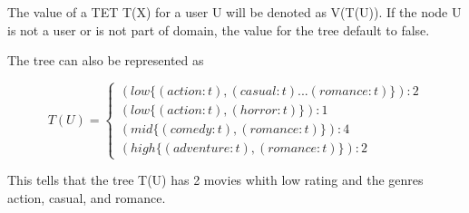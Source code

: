 
The value of a TET T(X) for a user U will be denoted as V(T(U)). If the node U is not a user or is not part of domain, the value for the tree default to false.

The tree can also be represented as 

\begin{equation}
    T(U)=
    \begin{cases}
      (low \{(action:t),(casual:t)... (romance:t)\}):2 \\
      (low \{(action:t),(horror:t)\}):1 \\
      (mid \{(comedy:t),(romance:t)\}):4 \\
      (high\{(adventure:t),(romance:t)\}):2
    \end{cases}
\end{equation}

This tells that the tree T(U) has 2 movies whith low rating and the genres action, casual, and romance.
